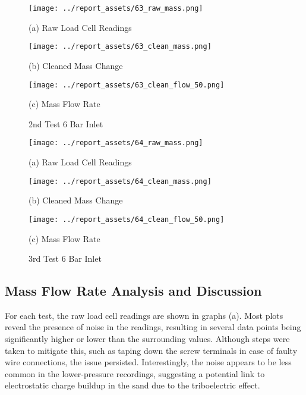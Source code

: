 \vfill
\begin{figure}[htbp]
    \centering

    \begin{minipage}{0.32\textwidth}
        \centering
        \texttt{[image: ../report\_assets/63\_raw\_mass.png]}
        \caption*{(a) Raw Load Cell Readings}
    \end{minipage}
    \hfill
    \begin{minipage}{0.32\textwidth}
        \centering
        \texttt{[image: ../report\_assets/63\_clean\_mass.png]}
        \caption*{(b) Cleaned Mass Change}
    \end{minipage}
    \hfill
    \begin{minipage}{0.32\textwidth}
        \centering
        \texttt{[image: ../report\_assets/63\_clean\_flow\_50.png]}
        \caption*{(c) Mass Flow Rate}
    \end{minipage}
    \caption{2nd Test 6 Bar Inlet}
    
\end{figure}\label{fig:63}

\vfill
\begin{figure}[htbp]
    \centering

    \begin{minipage}{0.32\textwidth}
        \centering
        \texttt{[image: ../report\_assets/64\_raw\_mass.png]}
        \caption*{(a) Raw Load Cell Readings}
    \end{minipage}
    \hfill
    \begin{minipage}{0.32\textwidth}
        \centering
        \texttt{[image: ../report\_assets/64\_clean\_mass.png]}
        \caption*{(b) Cleaned Mass Change}
    \end{minipage}
    \hfill
    \begin{minipage}{0.32\textwidth}
        \centering
        \texttt{[image: ../report\_assets/64\_clean\_flow\_50.png]}
        \caption*{(c) Mass Flow Rate}
    \end{minipage}
    \caption{3rd Test 6 Bar Inlet}
    
\end{figure}\label{fig:64}
\vfill
\newpage

\subsection{Mass Flow Rate Analysis and Discussion}
For each test, the raw load cell readings are shown in graphs (a). Most plots reveal the presence of noise in the readings, resulting in several data points being significantly higher or lower than the surrounding values. Although steps were taken to mitigate this, such as taping down the screw terminals in case of faulty wire connections, the issue persisted. Interestingly, the noise appears to be less common in the lower-pressure recordings, suggesting a potential link to electrostatic charge buildup in the sand due to the triboelectric effect.

